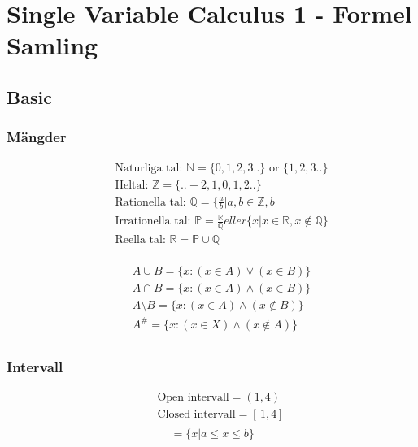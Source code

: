 \chapter{Single Variable Calculus 1 - Formel Samling}

\newpage

\section{Basic}
\subsection{Mängder}
\begin{align*}
  &\quad \text{Naturliga tal: } \mathbb{N} = \{0, 1, 2 , 3 ..  \} \text{ or } \{1, 2 , 3 ..  \} \\
  &\quad \text{Heltal: }\mathbb{Z} = \{.. -2, 1, 0, 1, 2 ..  \} \\
  &\quad \text{Rationella tal: }\mathbb{Q} = \{ \frac{a}{b} | a,b \in \mathbb{Z}, b \\
  &\quad \text{Irrationella tal: }\mathbb{P} = \frac{\mathbb{R}}{\mathbb{Q}}eller \{ x | x \in \mathbb{R}, x \notin \mathbb{Q} \} \\
  &\quad \text{Reella tal: }\mathbb{R} =  \mathbb{P} \cup \mathbb{Q} \\
\end{align*}

\begin{align*}
  &\quad A \cup B = \{ x:(x \in A) \lor (x \in B)\} \\
  &\quad A \cap B = \{ x:(x \in A) \land (x \in B)\} \\
  &\quad A \setminus B = \{ x:(x \in A) \land (x \notin B)\} \\
  &\quad A^{\text{\#}} = \{ x:(x \in X) \land (x \notin A)\} \\
\end{align*}


\newpage

\subsection{Intervall}
\begin{align*}
  &\quad \text{Open intervall} = (1,4) \\
  &\quad \text{Closed intervall} = [ \, 1,4 ] \, \\
\end{align*}
\begin{equation}
[ \, a, b ] \, = \{ x | a \leq x \leq b \}
\end{equation}

